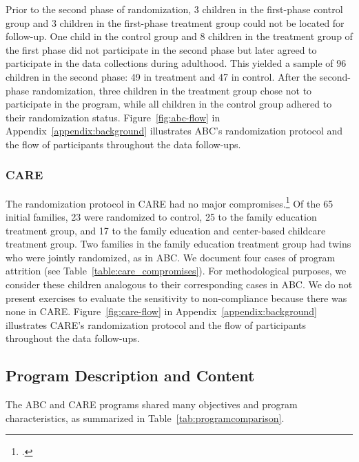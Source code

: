 \noindent Prior to the second phase of randomization, 3 children in the first-phase control group and 3 children in the first-phase treatment group could not be located for follow-up. One child in the control group and 8 children in the treatment group of the first phase did not participate in the second phase but later agreed to participate in the data collections during adulthood. This yielded a sample of 96 children in the second phase: 49 in treatment and 47 in control. After the second-phase randomization, three children in the treatment group chose not to participate in the program, while all children in the control group adhered to their randomization status. Figure~\ref{fig:abc-flow} in Appendix~\ref{appendix:background} illustrates ABC's randomization protocol and the flow of participants throughout the data follow-ups.\\

\subsubsection{CARE}

\noindent The randomization protocol in CARE had no major compromises.\footnote{\citet{Wasik_Ramey_etal_1990_CD,Burchinal_Campbell_etal_1997_CD}.} Of the 65 initial families, 23 were randomized to control, 25 to the family education treatment group, and 17 to the family education and center-based childcare treatment group. Two families in the family education treatment group had twins who were jointly randomized, as in ABC. We document four cases of program attrition (see Table~\ref{table:care_compromises}). For methodological purposes, we consider these children analogous to their corresponding cases in ABC. We do not present exercises to evaluate the sensitivity to non-compliance because there was none in CARE. Figure~\ref{fig:care-flow} in Appendix~\ref{appendix:background} illustrates CARE's randomization protocol and the flow of participants throughout the data follow-ups.\\



\subsection{Program Description and Content}

\noindent The ABC and CARE programs shared many objectives and program characteristics, as summarized in Table~\ref{tab:programcomparison}.\\

